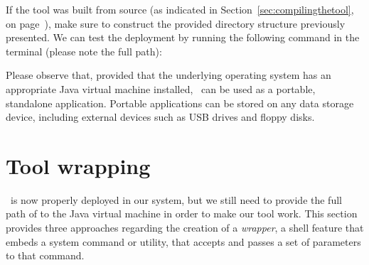 \vspace{1.4em}

If the tool was built from source (as indicated in Section~\ref{sec:compilingthetool}, on page~\pageref{sec:compilingthetool}), make sure to construct the provided directory structure previously presented. We can test the deployment by running the following command in the terminal (please note the full path):


Please observe that, provided that the underlying operating system has an appropriate Java virtual machine installed, \arara\ can be used as a portable, standalone application. Portable applications can be stored on any data storage device, including external devices such as USB drives and floppy disks.

\section{Tool wrapping}
\label{sec:toolwrapping}

\arara\ is now properly deployed in our system, but we still need to provide the full path of  to the Java virtual machine in order to make our tool work. This section provides three approaches regarding the creation of a \emph{wrapper}, a shell feature that embeds a system command or utility, that accepts and passes a set of parameters to that command.

